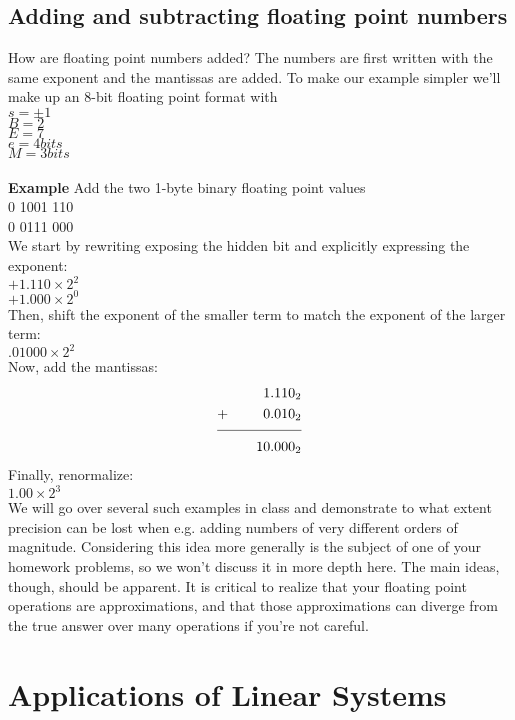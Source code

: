 \documentclass[11pt]{article}
\begin{document}
\subsection{Adding and subtracting floating point numbers}
How are floating point numbers added? The numbers are first written
with the same exponent and the mantissas are added.  To make our
example simpler we'll make up an 8-bit floating point format with \\

$s = \pm 1$ \\
$B = 2$ \\
$E = 7$ \\
$e = 4 bits$ \\
$M = 3 bits$ \\
\\
{\bf Example}
Add the two 1-byte binary floating point values \\
0 1001 110   \\
0 0111 000 \\
We start by rewriting exposing the hidden bit and explicitly expressing the exponent: \\
$+1.110 \times 2^2$\\
$+1.000 \times 2^0$\\
Then, shift the exponent of the smaller term to match the exponent of the larger term: \\
$.01000 \times 2^2$\\
Now, add the mantissas: \\
\begin{alignat*}{2}
    &&\text{1.110}_{2} \\
    &+\quad& \text{0.010}_{2} \\[-2\jot] \cline{1-3}
    &&\text{10.000}_{2}
 \end{alignat*}
Finally, renormalize: \\
$1.00 \times 2^3$ \\


We will go over several such examples in class and demonstrate to what
extent precision can be lost when e.g. adding numbers of very
different orders of magnitude. Considering this idea more generally is
the subject of one of your homework problems, so we won't discuss it
in more depth here. The main ideas, though, should be apparent. It is
critical to realize that your floating point operations are
approximations, and that those approximations can diverge from the
true answer over many operations if you're not careful.

\section{Applications of Linear Systems}
\end{document}
